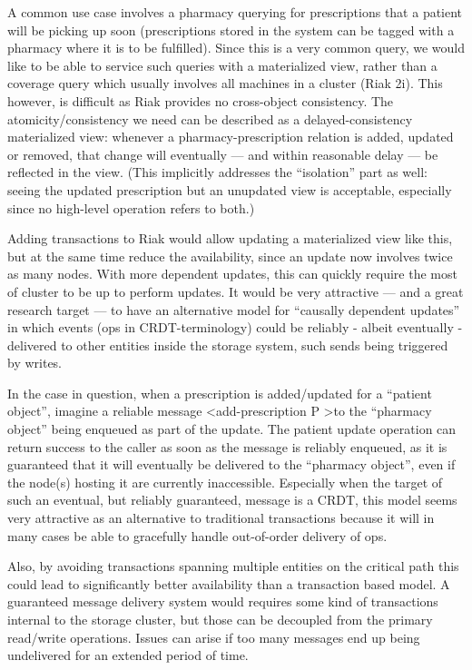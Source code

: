 \documentclass[11pt,a4paper]{report}
\begin{document}
A common use case involves a pharmacy querying for prescriptions that a patient will be picking up soon (prescriptions stored in the system can be tagged with a pharmacy where it is to be fulfilled). Since this is a very common query, we would like to be able to service such queries with a materialized view, rather than a coverage query which usually involves all machines in a cluster (Riak 2i). This however, is difficult as Riak provides no cross-object consistency.
The atomicity/consistency we need can be described as a delayed-consistency materialized view: whenever a pharmacy-prescription relation is added, updated or removed, that change will eventually — and within reasonable delay — be reflected in the view.
(This implicitly addresses the ``isolation'' part as well: seeing the updated prescription but an unupdated view is acceptable, especially since no high-level operation refers to both.)

Adding transactions to Riak would allow updating a materialized view like this, but at the same time reduce the availability, since an update now involves twice as many nodes. With more dependent updates, this can quickly require the most of cluster to be up to perform updates.
It would be very attractive — and a great research target — to have an alternative model for ``causally dependent updates'' in which events (ops in CRDT-terminology) could be reliably - albeit eventually - delivered to other entities inside the storage system, such sends being triggered by writes.

In the case in question, when a prescription is added/updated for a ``patient object'', imagine a reliable message  \textless add-prescription P \textgreater to the ``pharmacy object'' being enqueued as part of the update. The patient update operation can return success to the caller as soon as the message is reliably enqueued, as it is guaranteed that it will eventually be delivered to the ``pharmacy object'', even if the node(s) hosting it are currently inaccessible. Especially when the target of such an eventual, but reliably guaranteed, message is a CRDT, this model seems very attractive as an alternative to traditional transactions because it will in many cases be able to gracefully handle out-of-order delivery of ops.
  
Also, by avoiding transactions spanning multiple entities on the critical path this could lead to significantly better availability than a transaction based model.
A guaranteed message delivery system would requires some kind of transactions internal to the storage cluster, but those can be decoupled from the primary read/write operations. Issues can arise if too many messages end up being undelivered for an extended period of time.
\end{document}
